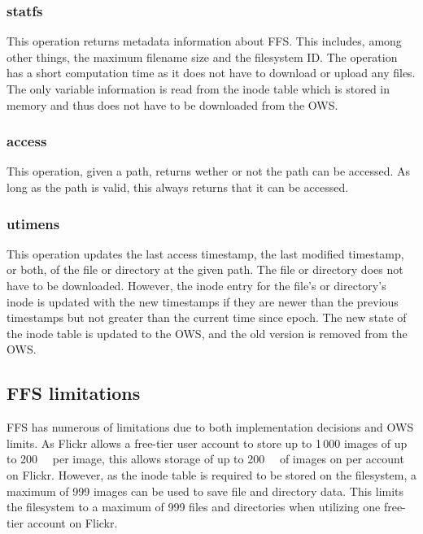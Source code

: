 \subsubsection{statfs}
This operation returns metadata information about FFS. This includes, among other things, the maximum filename size and the filesystem ID. The operation has a short computation time as it does not have to download or upload any files. The only variable information is read from the inode table which is stored in memory and thus does not have to be downloaded from the OWS.

\subsubsection{access}
This operation, given a path, returns wether or not the path can be accessed. As long as the path is valid, this always returns that it can be accessed.

\subsubsection{utimens}
This operation updates the last access timestamp, the last modified timestamp, or both, of the file or directory at the given path. The file or directory does not have to be downloaded. However, the inode entry for the file's or directory's inode is updated with the new timestamps if they are newer than the previous timestamps but not greater than the current time since epoch. The new state of the inode table is updated to the OWS, and the old version is removed from the OWS.


\subsection{FFS limitations}
\label{subsec:ffs_limits}
FFS has numerous of limitations due to both implementation decisions and OWS limits. As Flickr allows a free-tier user account to store up to 1\,000 images of up to \SI{200}{\mega\byte} per image, this allows storage of up to \SI{200}{\giga\byte} of images on per account on Flickr. However, as the inode table is required to be stored on the filesystem, a maximum of 999 images can be used to save file and directory data. This limits the filesystem to a maximum of 999 files and directories when utilizing one free-tier account on Flickr. 

